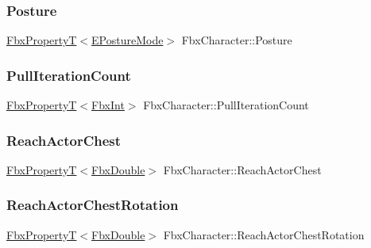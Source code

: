 \mbox{\label{class_fbx_character_ae4d654dc816661a08bc56afe92777619}} 
\subsubsection{\texorpdfstring{Posture}{Posture}}
{\footnotesize\ttfamily \hyperlink{class_fbx_property_t}{Fbx\+PropertyT}$<$\hyperlink{class_fbx_character_a75545d98d73cc8dd7c1bf491bf004113}{E\+Posture\+Mode}$>$ Fbx\+Character\+::\+Posture}

\mbox{\label{class_fbx_character_aa9fba8bc68ce346b97a22553e84635b0}} 
\subsubsection{\texorpdfstring{Pull\+Iteration\+Count}{PullIterationCount}}
{\footnotesize\ttfamily \hyperlink{class_fbx_property_t}{Fbx\+PropertyT}$<$\hyperlink{fbxtypes_8h_a088fa96de3b0b3ea69f0f6afef525dfb}{Fbx\+Int}$>$ Fbx\+Character\+::\+Pull\+Iteration\+Count}

\mbox{\label{class_fbx_character_ad89af6652b384959dbd29e34290bb3fd}} 
\subsubsection{\texorpdfstring{Reach\+Actor\+Chest}{ReachActorChest}}
{\footnotesize\ttfamily \hyperlink{class_fbx_property_t}{Fbx\+PropertyT}$<$\hyperlink{fbxtypes_8h_a171e72a1c46fc15c1a6c9c31948c1c5b}{Fbx\+Double}$>$ Fbx\+Character\+::\+Reach\+Actor\+Chest}

\mbox{\label{class_fbx_character_a448705b8ffd45a455d42c9eb5be13260}} 
\subsubsection{\texorpdfstring{Reach\+Actor\+Chest\+Rotation}{ReachActorChestRotation}}
{\footnotesize\ttfamily \hyperlink{class_fbx_property_t}{Fbx\+PropertyT}$<$\hyperlink{fbxtypes_8h_a171e72a1c46fc15c1a6c9c31948c1c5b}{Fbx\+Double}$>$ Fbx\+Character\+::\+Reach\+Actor\+Chest\+Rotation}

